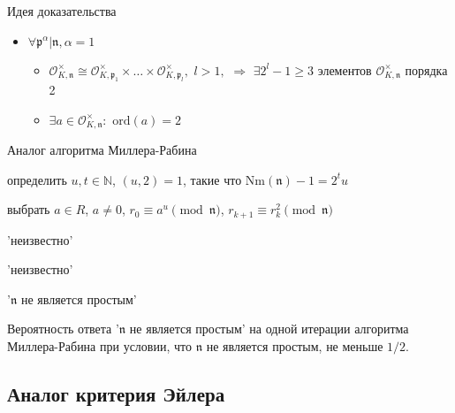 \documentclass[8pt, xcolor=x11names]{beamer}
\begin{document}
\begin{frame}
\begin{block}{Идея доказательства}
\begin{itemize}
            \item $\forall \mathfrak{p}^\alpha|\mathfrak{n}, \alpha = 1$
            \begin{itemize}
                \item $\mathcal{O}_{K,\mathfrak{n}}^\times\cong \mathcal{O}_{K,\mathfrak{p}_1}^\times \times\ldots\times \mathcal{O}_{K,\mathfrak{p}_l}^\times,$ $l>1,$ $\Rightarrow$ $\exists 2^l-1\ge 3$ элементов $\mathcal{O}_{K,\mathfrak{n}}^\times$ порядка 2 
                
                \item $\exists a \in \mathcal{O}_{K,\mathfrak{n}}^\times:$ $\textrm{ord}(a)=2$
            \end{itemize}
        \end{itemize}
    \end{block}
\end{frame}

\begin{frame}
    \begin{block}{Аналог алгоритма Миллера-Рабина}
        \begin{algorithmic}[1]
            \State определить $u, t \in \mathbb{N}$, $(u,2) = 1$, такие что $\textrm{Nm}(\mathfrak{n})-1 = 2^tu$
    
            \State выбрать $a \in R$, $a \neq 0$, $r_0\equiv a^u \pmod{\mathfrak{n}}$, $r_{k + 1} \equiv r_k^2 \pmod{\mathfrak{n}}$
            
                \State\Return 'неизвестно'
            \EndIf

                    \State\Return 'неизвестно'
                \EndIf
            \EndFor
            
            \State\Return '$\mathfrak{n}$ не является простым'
        \end{algorithmic}

        Вероятность ответа '$\mathfrak{n}$ не является простым' на одной итерации алгоритма Миллера-Рабина при условии, что $\mathfrak{n}$ не является простым, не меньше $1/2$.
    \end{block}
\end{frame}

\subsection{Аналог критерия Эйлера}
\end{document}
